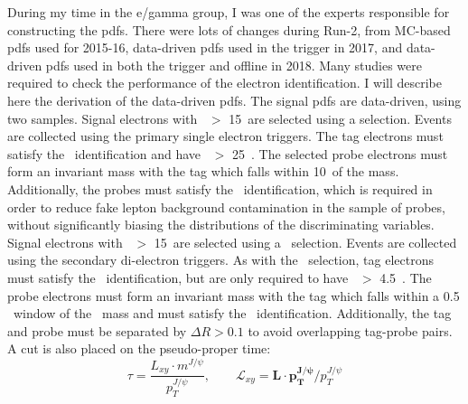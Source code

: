 During my time in the e/gamma group, I was one of the experts responsible for constructing the pdfs.
There were lots of changes during Run-2, from MC-based pdfs used for 2015-16, data-driven pdfs used in the trigger in 2017, and data-driven pdfs used in both the trigger and offline in 2018.
Many studies were required to check the performance of the electron identification.  I will describe here the derivation of the data-driven pdfs.
The signal pdfs are data-driven, using two samples.
Signal electrons with \pt\ $>$ 15~\GeV are selected using a \Zee \tnp selection. Events are collected using the primary single electron triggers.
The tag electrons must satisfy the \TightLH\ identification and have \pt\ $>$ 25~\GeV.
The selected probe electrons must form an invariant mass with the tag which falls within 10~\GeV of the \Zboson mass.
Additionally, the probes must satisfy the \VeryLooseLH\ identification, which is required in order to reduce fake lepton background contamination in the sample of probes, without significantly biasing the distributions of the discriminating variables.
Signal electrons with \pt\ $>$ 15~\GeV are selected using a \Jpsi\ \tnp selection. 
Events are collected using the secondary di-electron triggers.
As with the \Zee\ \tnp selection, tag electrons must satisfy the \TightLH\ identification, but are only required to have \pt\ $>$ 4.5~\GeV.
The probe electrons must form an invariant mass with the tag which falls within a 0.5 ~\GeV window of the \Jpsi\ mass and must satisfy the \VeryLooseLH\ identification.
Additionally, the tag and probe must be separated by $\Delta R > 0.1$ to avoid overlapping tag-probe pairs.
A cut is also placed on the pseudo-proper time:
\[\tau=\frac{L_{xy}\cdot m^{J/\psi}}{p_T^{J/\psi}}, \qquad \mathcal{L}_{xy}=\mathbf{L}\cdot\mathbf{p_T^{J/\psi}}/ p_T^{J/\psi}\]
